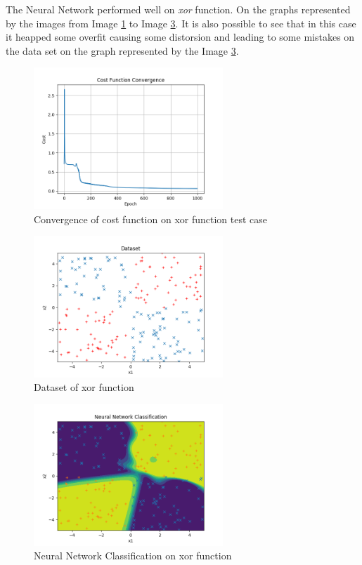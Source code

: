 \documentclass[journal]{IEEEtran}
\begin{document}
The Neural Network performed well on \textit{xor} function. On the graphs represented by the images from Image \ref{img:xor_cost} to Image \ref{img:xor_classification}. It is also possible to see that in this case it heapped some overfit causing some distorsion and leading to some mistakes on the data set on the graph represented by the Image \ref{img:xor_classification}.

\begin{figure}
  \begin{center}
  \includegraphics[width=2.8in]{./../code/result_xor/cost_function_convergence.png}
  \caption{Convergence of cost function on xor function test case}
  \label{img:xor_cost}
  \end{center}
\end{figure}

\begin{figure}
  \begin{center}
  \includegraphics[width=2.8in]{./../code/result_xor/dataset.png}
  \caption{Dataset of xor function}
  \label{img:xor_data_set}
  \end{center}
\end{figure}

\begin{figure}
  \begin{center}
  \includegraphics[width=2.8in]{./../code/result_xor/neural_net_classification.png}
  \caption{Neural Network Classification on xor function}
  \label{img:xor_classification}
  \end{center}
\end{figure}
\end{document}
